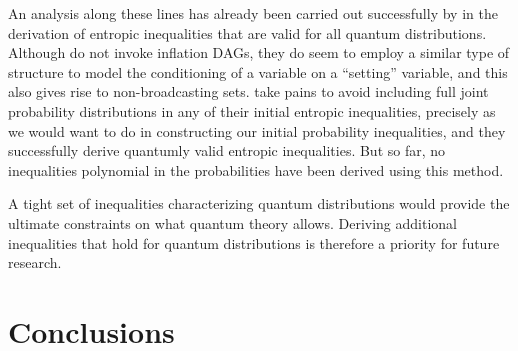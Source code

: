 An analysis along these lines has already been carried out successfully by \citet{Chaves2015infoquantum} in the derivation of entropic inequalities that are valid for all quantum distributions. Although \citet{Chaves2015infoquantum} do not invoke inflation DAGs, they do seem to employ a similar type of structure to model the conditioning of a variable on a ``setting'' variable, and this also gives rise to non-broadcasting sets. \citet{Chaves2015infoquantum} take pains to avoid including full joint probability distributions in any of their initial entropic inequalities, precisely as we would want to do in constructing our initial probability inequalities, and they successfully derive quantumly valid entropic inequalities. But so far, no inequalities polynomial in the probabilities have been derived using this method.


A tight set of inequalities characterizing quantum distributions would provide the ultimate constraints on what quantum theory allows. Deriving additional inequalities that hold for quantum distributions is therefore a priority for future research.








\section{Conclusions}


